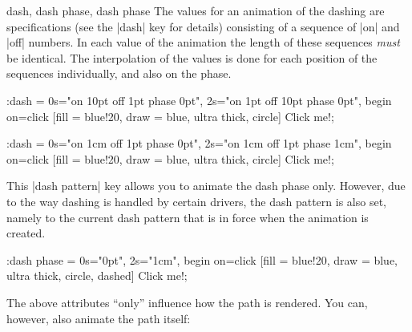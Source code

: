 \begin{tikzanimateattribute}{dash, dash phase, dash phase}
    The values for an animation of the dashing are specifications (see the
    |dash| key for details) consisting of a sequence of |on| and |off| numbers.
    In each value of the animation the length of these sequences \emph{must} be
    identical. The interpolation of the values is done for each position of the
    sequences individually, and also on the phase.
\begin{codeexample}[imagesource={standalone/pgfmanual-en-tikz-animations-animation-28.svg}]
\tikz \node :dash = { 0s="on 10pt off 1pt  phase 0pt",
                      2s="on 1pt  off 10pt phase 0pt", begin on=click}
  [fill = blue!20, draw = blue, ultra thick, circle] {Click me!};
\end{codeexample}
\begin{codeexample}[imagesource={standalone/pgfmanual-en-tikz-animations-animation-29.svg}]
\tikz \node :dash = { 0s="on 1cm off 1pt phase 0pt",
                      2s="on 1cm off 1pt phase 1cm", begin on=click}
  [fill = blue!20, draw = blue, ultra thick, circle] {Click me!};
\end{codeexample}

    This |dash pattern| key allows you to animate the dash phase only. However,
    due to the way dashing is handled by certain drivers, the dash pattern is
    also set, namely to the current dash pattern that is in force when the
    animation is created.
\begin{codeexample}[imagesource={standalone/pgfmanual-en-tikz-animations-animation-30.svg}]
\tikz \node :dash phase = { 0s="0pt", 2s="1cm", begin on=click}
  [fill = blue!20, draw = blue, ultra thick, circle, dashed] {Click me!};
\end{codeexample}
\end{tikzanimateattribute}

The above attributes ``only'' influence how the path is rendered. You can,
however, also animate the path itself:

